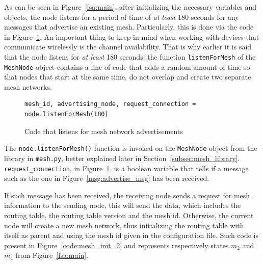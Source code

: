 				As can be seen in Figure~\ref{fsa:main}, after initializing the necessary variables and objects, the node listens for a period of time of \textit{at least} 180 seconds for any messages that advertise an existing mesh.
				Particularly, this is done via the code in Figure~\ref{code:mesh_init_1}.
				An important thing to keep in mind when working with devices that communicate wirelessly is the channel availability.
				That is why earlier it is said that the node listens for \textit{at least} 180 seconds: the function \texttt{listenForMesh} of the \texttt{MeshNode} object contains a line of code that adds a random amount of time so that nodes that start at the same time, do not overlap and create two separate mesh networks.
				
				\begin{figure}[H]
					\begin{lstlisting}
mesh_id, advertising_node, request_connection = node.listenForMesh(180)
					\end{lstlisting}		
					\label{code:mesh_init_1}
					\caption{Code that listens for mesh network advertisements}
				\end{figure}
			
				The \texttt{node.listenForMesh()} function is invoked on the \texttt{MeshNode} object from the library in \texttt{mesh.py}, better explained later in Section~\ref{subsec:mesh_library}.				
				\texttt{request\_connection}, in Figure~\ref{code:mesh_init_1}, is a boolean variable that tells if a message such as the one in Figure~\ref{msg:advertise_msg} has been received.
				
				
				If such message has been received, the receiving node sends a request for mesh information to the sending node, this will send the data, which includes the routing table, the routing table version and the mesh id.
				Otherwise, the current node will create a new mesh network, thus initializing the routing table with itself as parent and using the mesh id given in the configuration file.
				Such code is present in Figure~\ref{code:mesh_init_2} and represents respectively states $m_{2}$ and $m_{4}$ from Figure~\ref{fsa:main}.
									
